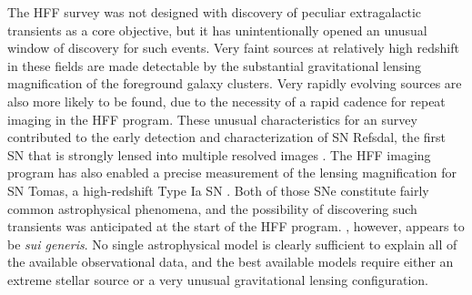The HFF survey was not designed with discovery of peculiar
extragalactic transients as a core objective, but it has
unintentionally opened an unusual window of discovery for such events.
Very faint sources at relatively high redshift in these fields are
made detectable by the substantial gravitational lensing magnification
of the foreground galaxy clusters.  Very rapidly evolving sources are
also more likely to be found, due to the necessity of a rapid cadence
for repeat imaging in the HFF program.  These unusual characteristics
for an \HST survey contributed to the early detection and
characterization of SN Refsdal, the first SN that is strongly lensed
into multiple resolved images \citep{Kelly:2015a}.  The HFF imaging
program has also enabled a precise measurement of the lensing
magnification for SN Tomas, a high-redshift Type Ia SN
\citep{Rodney:2015a}.   Both of those SNe constitute fairly common
astrophysical phenomena, and the possibility of discovering such
transients was anticipated at the start of the HFF program.  \spock,
however, appears to be {\it sui generis}.  No single astrophysical
model is clearly sufficient to explain all of the available
observational data, and the best available models require either an
extreme stellar source or a very unusual gravitational lensing
configuration.
